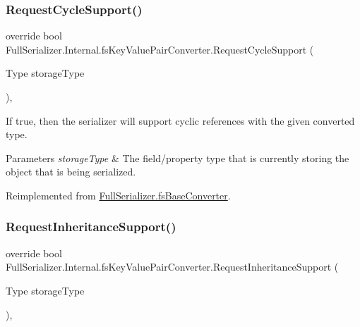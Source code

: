 \subsubsection{\texorpdfstring{Request\+Cycle\+Support()}{RequestCycleSupport()}}
{\footnotesize\ttfamily override bool Full\+Serializer.\+Internal.\+fs\+Key\+Value\+Pair\+Converter.\+Request\+Cycle\+Support (\begin{DoxyParamCaption}\item[{Type}]{storage\+Type }\end{DoxyParamCaption})\hspace{0.3cm}{\ttfamily [inline]}, {\ttfamily [virtual]}}



If true, then the serializer will support cyclic references with the given converted type. 


\begin{DoxyParams}{Parameters}
{\em storage\+Type} & The field/property type that is currently storing the object that is being serialized.\\
\hline
\end{DoxyParams}


Reimplemented from \hyperlink{class_full_serializer_1_1fs_base_converter_a4e850ab88cea1b89771c00e0b65febcd}{Full\+Serializer.\+fs\+Base\+Converter}.

\mbox{\label{class_full_serializer_1_1_internal_1_1fs_key_value_pair_converter_af20b5573e313464e13c17735746a2267}} 
\subsubsection{\texorpdfstring{Request\+Inheritance\+Support()}{RequestInheritanceSupport()}}
{\footnotesize\ttfamily override bool Full\+Serializer.\+Internal.\+fs\+Key\+Value\+Pair\+Converter.\+Request\+Inheritance\+Support (\begin{DoxyParamCaption}\item[{Type}]{storage\+Type }\end{DoxyParamCaption})\hspace{0.3cm}{\ttfamily [inline]}, {\ttfamily [virtual]}}



